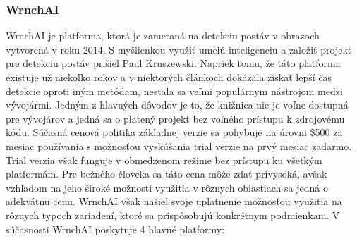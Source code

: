\documentclass[slovak,master,dept460,male,cpp,cpdeclaration]{diploma}
\begin{document}
\subsubsection*{WrnchAI}
WrnchAI\cite{wrnchAI} je platforma, ktorá je zameraná na detekciu postáv v obrazoch vytvorená v roku 2014. S myšlienkou využiť umelú inteligenciu a založiť projekt pre detekciu postáv prišiel Paul Kruszewski. Napriek tomu, že táto platforma existuje už niekoľko rokov a v niektorých článkoch\cite{openposeVsWrnchAI} dokázala získať lepší čas detekcie oproti iným metódam,  nestala sa veľmi populárnym nástrojom medzi vývojármi. Jedným z hlavných dôvodov je to, že knižnica nie je voľne dostupná pre vývojárov a jedná sa o platený projekt bez voľného prístupu k zdrojovému kódu. Súčasná cenová politika základnej verzie sa pohybuje na úrovni \$500 za mesiac používania s možnosťou vyskúšania trial verzie na prvý mesiac zadarmo. Trial verzia však funguje v obmedzenom režime  bez prístupu ku všetkým platformám. Pre bežného človeka sa táto cena môže zdať privysoká, avšak vzhľadom na jeho široké možnosti využitia  v rôznych oblastiach sa jedná o adekvátnu cenu. WrnchAI však našiel svoje uplatnenie možnosťou využitia na rôznych typoch zariadení, ktoré sa prispôsobujú konkrétnym podmienkam. V súčasnosti WrnchAI poskytuje 4 hlavné platformy:
\end{document}

